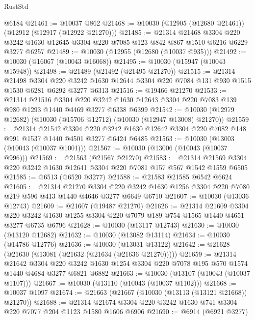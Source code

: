 \begin{lexlean}{RustStd}
\begin{coremodule}
    @6184
@21461 := @10037 @862
@21468 := @10030 (@12905 (@12680 @21461)) (@12912 (@12917 (@12922 @21270)))
@21485 := @21314
    @21468
    @3304
    @220
    @3242
    @1630
    @12645
    @3304
    @220
    @7085
    @123
    @842
    @867
    @1510
    @6216
    @6229
    @3277
    @6257
@21489 := @10030 (@12955 (@12680 (@10037 @935)))
@21492 := @10030 (@16067 (@10043 @16068))
@21495 := @10030 (@15947 (@10043 @15948))
@21498 := @21489 (@21492 (@21495 @21270))
@21515 := @21314
    @21498
    @3304
    @220
    @3242
    @1630
    @12644
    @3304
    @220
    @7084
    @131
    @930
    @1515
    @1530
    @6281
    @6292
    @3277
    @6313
@21516 := @19466 @21270
@21533 := @21314
    @21516
    @3304
    @220
    @3242
    @1630
    @12643
    @3304
    @220
    @7083
    @139
    @980
    @1293
    @1440
    @4469
    @3277
    @6338
    @6399
@21542 := @10030 (@12979 @12682) (@10030 (@15706 @12712) (@10030 (@12947 @13008) @21270))
@21559 := @21314
    @21542
    @3304
    @220
    @3242
    @1630
    @12642
    @3304
    @220
    @7082
    @148
    @991
    @1537
    @1440
    @4501
    @3277
    @6424
    @6485
@21563 := @10030 (@13003 (@10043 (@10037 @1001)))
@21567 := @10030 (@13006 (@10043 (@10037 @996)))
@21569 := @21563 (@21567 @21270)
@21583 := @21314 @21569 @3304 @220 @3242 @1630 @12641 @3304 @220 @7081 @157 @567 @1542 @1559 @6505
@21585 := @6513 (@6520 @3277)
@21588 := @21583 @21585 @6542 @6624
@21605 := @21314
    @21270
    @3304
    @220
    @3242
    @1630
    @1256
    @3304
    @220
    @7080
    @219
    @596
    @413
    @1440
    @4646
    @3277
    @6649
    @6710
@21607 := @10030 (@13036 @12743)
@21609 := @21607 (@19487 @21270)
@21626 := @21314
    @21609
    @3304
    @220
    @3242
    @1630
    @1255
    @3304
    @220
    @7079
    @189
    @754
    @1565
    @1440
    @4651
    @3277
    @6735
    @6796
@21628 := @10030 (@13117 @12743)
@21630 := @10030 (@13120 @12682)
@21632 := @10030 (@13082 @13114)
@21634 := @10030 (@14786 @12776)
@21636 := @10030 (@13031 @13122)
@21642 := @21628 (@21630 (@13081 (@21632 (@21634 (@21636 @21270)))))
@21659 := @21314
    @21642
    @3304
    @220
    @3242
    @1630
    @1254
    @3304
    @220
    @7078
    @195
    @570
    @1574
    @1440
    @4684
    @3277
    @6821
    @6882
@21663 := @10030 (@13107 (@10043 (@10037 @1107)))
@21667 := @10030 (@13110 (@10043 (@10037 @1102)))
@21668 := @10037 @1097
@21674 := @21663 (@21667 (@10030 (@13113 (@13121 @21668)) @21270))
@21688 := @21314 @21674 @3304 @220 @3242 @1630 @741 @3304 @220 @7077 @204 @1123 @1580 @1606 @6906
@21690 := @6914 (@6921 @3277)

\end{coremodule}
\end{lexlean}
